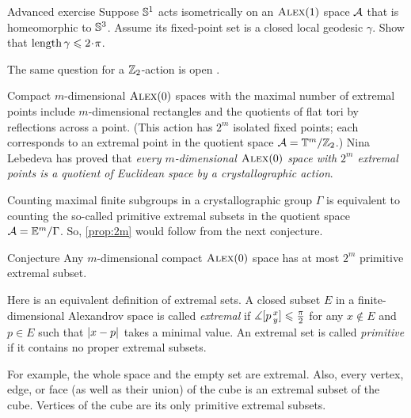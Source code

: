 \begin{thm}{Advanced exercise}\label{ex:S1actsS3}
Suppose $\mathbb{S}^1$ acts isometrically on an $\textsc{Alex}(1)$ space $\mathcal{A}$ that is homeomorphic to $\mathbb{S}^3$.
Assume its fixed-point set is a closed local geodesic $\gamma$.
Show that $\length\gamma\le2\cdot\pi$.
\end{thm}

The same question for a $\mathbb{Z}_2$-action is open \cite{petrunin-involution}.

Compact $m$-dimensional $\textsc{Alex}(0)$ spaces with the maximal number of extremal points include $m$-dimensional rectangles and the quotients of flat tori by reflections across a point.
(This action has $2^m$ isolated fixed points; each corresponds to an extremal point in the quotient space $\mathcal{A}=\mathbb{T}^m/\mathbb{Z}_2$.)
Nina Lebedeva has proved \cite{lebedeva} that \textit{every $m$-dimensional $\textsc{Alex}(0)$ space with $2^m$ extremal points is a quotient of Euclidean space by a crystallographic action}.

Counting maximal finite subgroups in a crystallographic group $\Gamma$ is equivalent to counting the so-called primitive extremal subsets in the quotient space $\mathcal{A}=\mathbb{E}^m/\Gamma$.
So, \ref{prop:2m} would follow from the next conjecture.

\begin{thm}{Conjecture}
Any $m$-dimensional compact $\textsc{Alex}(0)$ space has at most $2^m$ primitive extremal subset.
\end{thm}

Here is an equivalent definition of extremal sets.  
A closed subset $E$ in a finite-dimensional Alexandrov space is called 
\emph{extremal} if $\measuredangle[p\,{}^{x}_{y}]\leqslant \tfrac\pi2$ for any $x\notin E$ and $p\in E$ such that $|{x}-{p}|_{}^{{}}$ takes a minimal value.
An extremal set is called \emph{primitive} if it contains no proper extremal subsets.

For example, the whole space and the empty set are extremal.
Also, every vertex, edge, or face (as well as their union) of the cube is an extremal subset of the cube.
Vertices of the cube are its only primitive extremal subsets.

